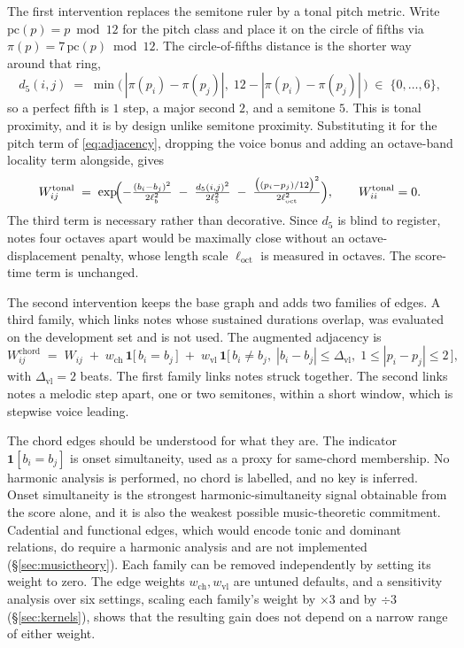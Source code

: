 The first intervention replaces the semitone ruler by a tonal pitch metric.
Write $\mathrm{pc}(p) = p \bmod 12$ for the pitch class and place it on the
circle of fifths via $\pi(p) = 7\,\mathrm{pc}(p) \bmod 12$. The
circle-of-fifths distance is the shorter way around that ring,
\begin{equation}
  d_5(i,j) \;=\; \min\bigl(\,|\pi(p_i) - \pi(p_j)|,\; 12 - |\pi(p_i) - \pi(p_j)|\,\bigr)
  \;\in\; \{0,\dots,6\},
  \label{eq:fifths}
\end{equation}
so a perfect fifth is $1$ step, a major second $2$, and a semitone $5$. This
is tonal proximity, and it is by design unlike semitone proximity.
Substituting it for the pitch term of \eqref{eq:adjacency}, dropping the
voice bonus and adding an octave-band locality term alongside, gives
\begin{equation}
  W^{\mathrm{tonal}}_{ij} \;=\; \exp\!\Bigl( -\tfrac{(b_i - b_j)^2}{2\ell_b^2}
    \;-\; \tfrac{d_5(i,j)^2}{2\ell_5^2}
    \;-\; \tfrac{\bigl((p_i - p_j)/12\bigr)^2}{2\ell_{\mathrm{oct}}^2} \Bigr),
  \qquad W^{\mathrm{tonal}}_{ii} = 0 .
  \label{eq:tonaladj}
\end{equation}
The third term is necessary rather than decorative. Since $d_5$ is blind to
register, notes four octaves apart would be maximally close without an
octave-displacement penalty, whose length scale $\ell_{\mathrm{oct}}$ is
measured in octaves. The score-time term is unchanged.

The second intervention keeps the base graph and adds two families of edges.
A third family, which links notes whose sustained durations overlap, was
evaluated on the development set and is not used. The augmented adjacency is
\begin{equation}
  W^{\mathrm{chord}}_{ij} \;=\; W_{ij}
    \;+\; w_{\mathrm{ch}}\, \mathbf{1}\bigl[\, b_i = b_j \,\bigr]
    \;+\; w_{\mathrm{vl}}\, \mathbf{1}\bigl[\, b_i \neq b_j,\;
        |b_i - b_j| \le \Delta_{\mathrm{vl}},\;
        1 \le |p_i - p_j| \le 2 \,\bigr],
  \label{eq:harmadj}
\end{equation}
with $\Delta_{\mathrm{vl}} = 2$ beats. The first family links notes struck
together. The second links notes a melodic step apart, one or two semitones,
within a short window, which is stepwise voice leading.

The chord edges should be understood for what they are. The indicator
$\mathbf{1}[b_i = b_j]$ is onset simultaneity, used as a proxy for same-chord
membership. No harmonic analysis is performed, no chord is labelled, and no
key is inferred. Onset simultaneity is the strongest harmonic-simultaneity
signal obtainable from the score alone, and it is also the weakest possible
music-theoretic commitment. Cadential and functional edges, which would
encode tonic and dominant relations, do require a harmonic analysis and are
not implemented (\S\ref{sec:musictheory}). Each family can be removed
independently by setting its weight to zero. The edge weights
$w_{\mathrm{ch}}, w_{\mathrm{vl}}$ are untuned defaults, and a sensitivity
analysis over six settings, scaling each family's weight by $\times 3$ and
by $\div 3$ (\S\ref{sec:kernels}), shows that the resulting gain does not
depend on a narrow range of either weight.

